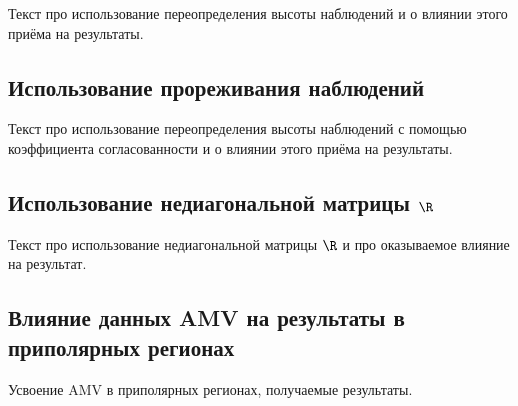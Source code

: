 Текст про использование переопределения высоты наблюдений и о влиянии этого приёма на результаты.

\subsection{Использование прореживания наблюдений} \label{subsect4_3_2}

Текст про использование переопределения высоты наблюдений с помощью коэффициента согласованности и о влиянии этого приёма на результаты.


\subsection{Использование недиагональной матрицы {$ \R $} } \label{subsect4_3_3}

Текст про использование недиагональной матрицы $ \R $ и про оказываемое влияние на результат. 

\subsection{Влияние данных AMV на результаты в приполярных регионах} \label{subsect4_3_4}

Усвоение AMV в приполярных регионах, получаемые результаты.
